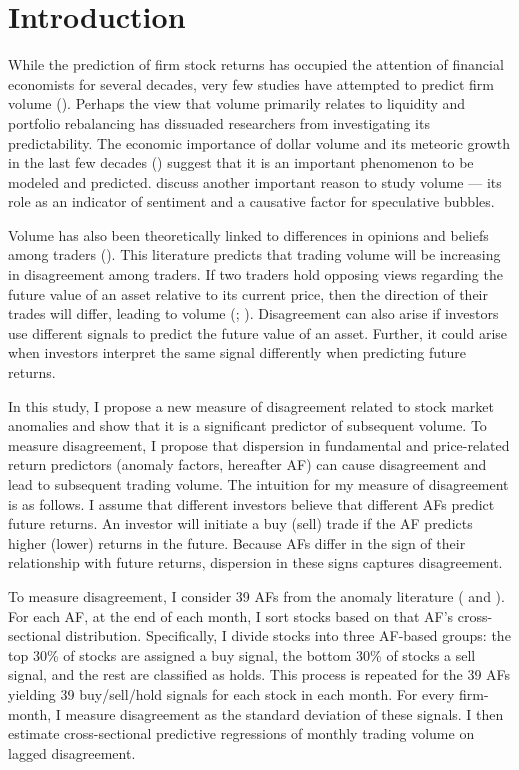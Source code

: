 \documentclass[
  12pt,
  a4paper,
  twoside,
  onecolumn]{article}
\begin{document}
\hypertarget{sec:intro}{%
\section{Introduction}\label{sec:intro}}

While the prediction of firm stock returns has occupied the attention of
financial economists for several decades, very few studies have
attempted to predict firm volume (\cite{lo_wang2010}). Perhaps the view
that volume primarily relates to liquidity and portfolio rebalancing has
dissuaded researchers from investigating its predictability. The
economic importance of dollar volume and its meteoric growth in the last
few decades (\cite{french_2008_turnover}) suggest that it is an
important phenomenon to be modeled and predicted. \cite{hong_stein2007}
discuss another important reason to study volume --- its role as an
indicator of sentiment and a causative factor for speculative bubbles.

Volume has also been theoretically linked to differences in opinions and
beliefs among traders (\cite{varian1989}). This literature predicts that
trading volume will be increasing in disagreement among traders. If two
traders hold opposing views regarding the future value of an asset
relative to its current price, then the direction of their trades will
differ, leading to volume (\cite{harris_raviv1993};
\cite{kandel_pearson1995}). Disagreement can also arise if investors use
different signals to predict the future value of an asset. Further, it
could arise when investors interpret the same signal differently when
predicting future returns.

In this study, I propose a new measure of disagreement related to stock
market anomalies and show that it is a significant predictor of
subsequent volume. To measure disagreement, I propose that dispersion in
fundamental and price-related return predictors (anomaly factors,
hereafter AF) can cause disagreement and lead to subsequent trading
volume. The intuition for my measure of disagreement is as follows. I
assume that different investors believe that different AFs predict
future returns. An investor will initiate a buy (sell) trade if the AF
predicts higher (lower) returns in the future. Because AFs differ in the
sign of their relationship with future returns, dispersion in these
signs captures disagreement.

To measure disagreement, I consider 39 AFs from the anomaly literature
(\cite{roberts2018} and \cite{mclean_pontiff2016}). For each AF, at the
end of each month, I sort stocks based on that AF's cross-sectional
distribution. Specifically, I divide stocks into three AF-based groups:
the top 30\% of stocks are assigned a buy signal, the bottom 30\% of
stocks a sell signal, and the rest are classified as holds. This process
is repeated for the 39 AFs yielding 39 buy/sell/hold signals for each
stock in each month. For every firm-month, I measure disagreement as the
standard deviation of these signals. I then estimate cross-sectional
predictive regressions of monthly trading volume on lagged disagreement.
\end{document}
